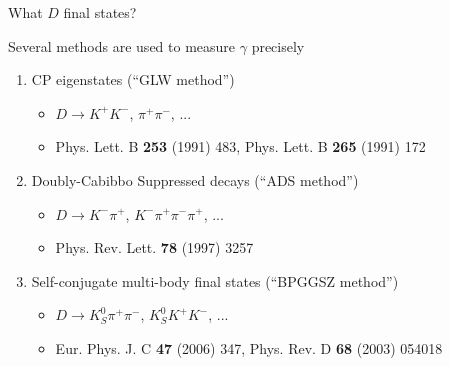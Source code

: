\documentclass[dvipsnames]{beamer}
\begin{document}
\begin{frame}{What $D$ final states?}
  \begin{center}
    \Large Several methods are used to measure $\gamma$ precisely
  \end{center}
  \vspace{0.2cm}
  \begin{enumerate}
    \setlength\itemsep{1.0em}
    \item{CP eigenstates (``GLW method'')}
    \begin{itemize}
      \item{$D\to K^+K^-$, $\pi^+\pi^-$, ...}
      \item{Phys. Lett. B \textbf{253} (1991) 483, Phys. Lett. B \textbf{265} (1991) 172}
    \end{itemize}
    \item{Doubly-Cabibbo Suppressed decays (``ADS method'')}
    \begin{itemize}
      \item{$D\to K^-\pi^+$, $K^-\pi^+\pi^-\pi^+$, ...}
      \item{Phys. Rev. Lett. \textbf{78} (1997) 3257}
    \end{itemize}
    \item{Self-conjugate multi-body final states (``BPGGSZ method'')}
    \begin{itemize}
      \item{$D\to K_S^0\pi^+\pi^-$, $K_S^0K^+K^-$, ...}
      \item{Eur. Phys. J. C \textbf{47} (2006) 347, Phys. Rev. D \textbf{68} (2003) 054018}
    \end{itemize}
  \end{enumerate}
\end{frame}
\end{document}
